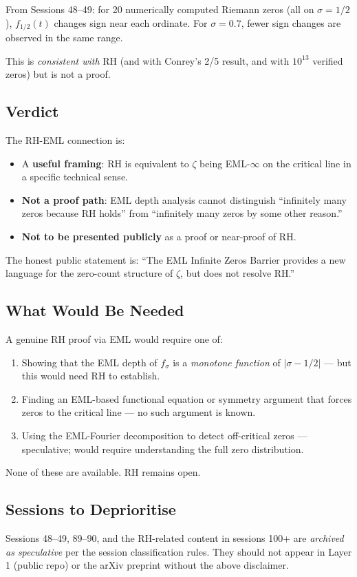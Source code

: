 From Sessions 48--49: for 20 numerically computed Riemann zeros (all on $\sigma=1/2$),
$f_{1/2}(t)$ changes sign near each ordinate.  For $\sigma = 0.7$, fewer
sign changes are observed in the same range.

This is \emph{consistent with} RH (and with Conrey's 2/5 result, and with
$10^{13}$ verified zeros) but is not a proof.

\subsection*{Verdict}

The RH-EML connection is:
\begin{itemize}
  \item A \textbf{useful framing}: RH is equivalent to $\zeta$ being EML-$\infty$
    on the critical line in a specific technical sense.
  \item \textbf{Not a proof path}: EML depth analysis cannot distinguish
    ``infinitely many zeros because RH holds'' from ``infinitely many zeros
    by some other reason.''
  \item \textbf{Not to be presented publicly} as a proof or near-proof of RH.
\end{itemize}

The honest public statement is: ``The EML Infinite Zeros Barrier provides a
new language for the zero-count structure of $\zeta$, but does not resolve RH.''

\subsection*{What Would Be Needed}

A genuine RH proof via EML would require one of:
\begin{enumerate}
  \item Showing that the EML depth of $f_\sigma$ is a \emph{monotone function}
    of $|\sigma - 1/2|$ --- but this would need RH to establish.
  \item Finding an EML-based functional equation or symmetry argument that
    forces zeros to the critical line --- no such argument is known.
  \item Using the EML-Fourier decomposition to detect off-critical zeros ---
    speculative; would require understanding the full zero distribution.
\end{enumerate}

None of these are available.  RH remains open.

\subsection*{Sessions to Deprioritise}

Sessions 48--49, 89--90, and the RH-related content in sessions 100+ are
\emph{archived as speculative} per the session classification rules.
They should not appear in Layer 1 (public repo) or the arXiv preprint
without the above disclaimer.
